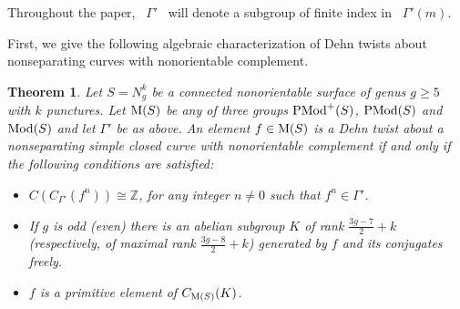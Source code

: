 \documentclass[11 pt]{amsart}
\newtheorem{Theorem}{Theorem}[section]
\theoremstyle{definition}
\begin{document}
Throughout the paper, \ $\Gamma'$ \ will denote a
subgroup of finite index in \ $\Gamma'(m)$.

First, we give the following algebraic characterization of Dehn
twists about nonseparating curves with nonorientable complement.

\begin{Theorem}\label{Chr-1}
Let $S=N_g^k$ be a connected nonorientable surface of genus $g\geq
5$ with $k$ punctures. Let ${\rm M}(S)$ be any of three groups ${\rm
PMod}^+(S)$, ${\rm PMod}(S)$ and ${\rm Mod}(S)$ and let $\Gamma'$ be
as above. An element $f \in {\rm M}(S)$ is a Dehn twist about a
nonseparating simple closed curve with nonorientable complement if
and only if the following conditions are satisfied:\\
\begin{itemize}
\item[i)] $C(C_{\Gamma'}(f^{n})) \cong \mathbb{Z}$, for any integer $n \neq 0$
such that $f^{n} \in \Gamma'$.

\item[ii)] If $g$ is odd (even) there is an abelian
subgroup $K$ of rank $\displaystyle\frac{3g-7}{2} + k$
(respectively, of maximal rank $\displaystyle\frac{3g-8}{2} + k$)
generated by $f$ and its conjugates freely.

\item[iii)] $f$ is a primitive element of $C_{{\rm M}(S)}(K)$.
\end{itemize}
\end{Theorem}
\end{document}
